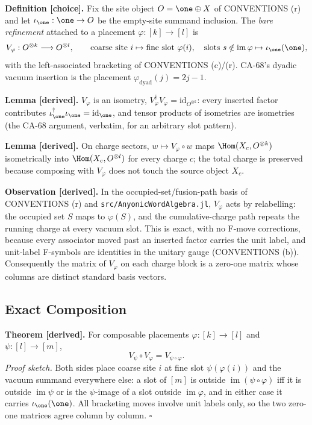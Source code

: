 \textbf{Definition [choice].}  Fix the site object \(O=\one\oplus X\) of
CONVENTIONS (r) and let \(\iota_{\one}:\one\to O\) be the empty-site summand
inclusion.  The \emph{bare refinement} attached to a placement
\(\varphi:[k]\to[l]\) is
\[
  V_\varphi:O^{\otimes k}\longrightarrow O^{\otimes l},
  \qquad
  \text{coarse site } i\mapsto\text{fine slot }\varphi(i),
  \quad
  \text{slots } s\notin\operatorname{im}\varphi\mapsto\iota_{\one}(\one),
\]
with the left-associated bracketing of CONVENTIONS (c)/(r).  CA-68's dyadic
vacuum insertion is the placement \(\varphi_{\mathrm{dyad}}(j)=2j-1\).

\textbf{Lemma [derived].}  \(V_\varphi\) is an isometry,
\(V_\varphi^\dagger V_\varphi=\mathrm{id}_{O^{\otimes k}}\): every inserted
factor contributes \(\iota_{\one}^\dagger\iota_{\one}=\mathrm{id}_{\one}\),
and tensor products of isometries are isometries (the CA-68 argument,
verbatim, for an arbitrary slot pattern).

\textbf{Lemma [derived].}  On charge sectors, \(w\mapsto V_\varphi\circ w\)
maps \(\Hom(X_c,O^{\otimes k})\) isometrically into
\(\Hom(X_c,O^{\otimes l})\) for every charge \(c\); the total charge is
preserved because composing with \(V_\varphi\) does not touch the source
object \(X_c\).

\textbf{Observation [derived].}  In the occupied-set/fusion-path basis of
CONVENTIONS (r) and \texttt{src/AnyonicWordAlgebra.jl}, \(V_\varphi\) acts by
relabelling: the occupied set \(S\) maps to \(\varphi(S)\), and the
cumulative-charge path repeats the running charge at every vacuum slot.
This is exact, with no F-move corrections, because every associator moved
past an inserted factor carries the unit label, and unit-label F-symbols are
identities in the unitary gauge (CONVENTIONS (b)).  Consequently the matrix
of \(V_\varphi\) on each charge block is a zero-one matrix whose columns are
distinct standard basis vectors.

\subsection{Exact Composition}

\textbf{Theorem [derived].}  For composable placements
\(\varphi:[k]\to[l]\) and \(\psi:[l]\to[m]\),
\[
  V_\psi\circ V_\varphi=V_{\psi\circ\varphi}.
\]
\emph{Proof sketch.}  Both sides place coarse site \(i\) at fine slot
\(\psi(\varphi(i))\) and the vacuum summand everywhere else: a slot of
\([m]\) is outside \(\operatorname{im}(\psi\circ\varphi)\) iff it is outside
\(\operatorname{im}\psi\) or is the \(\psi\)-image of a slot outside
\(\operatorname{im}\varphi\), and in either case it carries
\(\iota_{\one}(\one)\).  All bracketing moves involve unit labels only, so
the two zero-one matrices agree column by column.  \(\square\)

